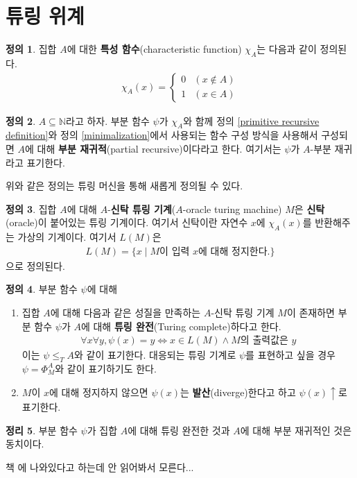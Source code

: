 \documentclass[b5paper, 11pt]{book}
\theoremstyle{definition}
\newtheorem{defn}{정의}[chapter]
\newtheorem{thm}[defn]{정리}
\newenvironment{pf*}{\pushQED{\qed}\pf}
{\popQED\endpf}
\begin{document}
\section{튜링 위계}
\begin{defn}
    집합 $A$에 대한 \textbf{특성 함수}(characteristic function) $\chi_A$는 다음과 같이 정의된다.
    \begin{align*}
        \chi_A(x) = 
        \begin{cases}
            0 & (x \notin A) \\ 
            1 & (x \in A)
        \end{cases}
    \end{align*}
\end{defn}
\begin{defn}
    $A \subseteq \mathbb{N}$라고 하자. 부분 함수 $\psi$가 
    $\chi_A$와 함께
    정의 \ref{primitive recursive definition}와 
    정의 \ref{minimalization}에서 사용되는 함수 구성 방식을 사용해서 구성되면 $A$에 대해 
    \textbf{부분 재귀적}(partial recursive)이다라고 한다. 여기서는 $\psi$가 $A$-부분 재귀라고 표기한다. 
\end{defn}
위와 같은 정의는 튜링 머신을 통해 새롭게 정의될 수 있다.
\begin{defn}
    집합 $A$에 대해 $A$-\textbf{신탁 튜링 기계}($A$-oracle turing machine) $M$은 \textbf{신탁}(oracle)이 붙어있는 튜링 기계이다. 여기서 신탁이란 자연수 $x$에 $\chi_A(x)$를 반환해주는 가상의 기계이다. 여기서 $L(M)$은 
    \begin{align*}
        L(M) = \{x \;\vert\; M\text{이 입력 } x\text{에 대해 정지한다.} \}
    \end{align*}
    으로 정의된다.
\end{defn}
\begin{defn}
    부분 함수 $\psi$에 대해
    \begin{enumerate}
        \item 집합 $A$에 대해 다음과 같은 성질을 만족하는 
        $A$-신탁 튜링 기계 $M$이 존재하면 부분 함수 $\psi$가 
        $A$에 대해 \textbf{튜링 완전}(Turing complete)하다고 한다.
        \begin{align*}
            \forall x \forall y,  \psi(x) = y \Leftrightarrow 
            x \in L(M) \wedge M\text{의 출력값은 } y
        \end{align*} 
        이는 $\psi \le_T A$와 같이 표기한다. 대응되는 튜링 기계로 $\psi$를 표현하고 싶을 경우
        $\psi = \Phi_M^A$와 같이 표기하기도 한다. 
        \item $M$이 $x$에 대해 정지하지 않으면 $\psi(x)$는 \textbf{발산}(diverge)한다고 하고
        $\psi(x) \uparrow$로 표기한다.
    \end{enumerate}
\end{defn}
\begin{thm}
    부분 함수 $\psi$가 집합 $A$에 대해 튜링 완전한 것과 $A$에 대해 부분 재귀적인 것은 동치이다.
\end{thm}
\begin{pf*}
    책 \cite{kleene1952introduction}에 나와있다고 하는데 안 읽어봐서 모른다...
\end{pf*}
\end{document}
